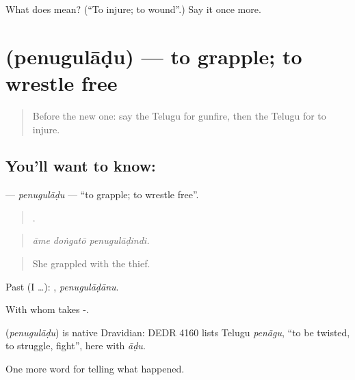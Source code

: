 \begin{tcolorbox}[breakable,colback=teal!4,colframe=teal!35!black,title={Before you move on}]
What does  mean? (\textquotedblleft{}To injure; to wound\textquotedblright{}.) Say it once more.
\end{tcolorbox}
\section[\texorpdfstring{\te{పెనుగులాడు} (penugulāḍu)}{పెనుగులాడు (penugulāḍu)}]{ (penugulāḍu) — to grapple; to wrestle free}

\label{lesson:TE-C378-penuguladu}



\begin{quote}
Before the new one: say the Telugu for gunfire, then the Telugu for to injure.
\end{quote}

\subsection*{You'll want to know: }
\textbf{} — \emph{penugulāḍu} — \textquotedblleft{}to grapple; to wrestle free\textquotedblright{}.

\begin{quote}
  .
\end{quote}

\begin{quote}
\emph{āme doṅgatō penugulāḍindi.}
\end{quote}

\begin{quote}
She grappled with the thief.
\end{quote}

Past (I …): , \emph{penugulāḍānu}.

With whom takes -.

\begin{cousinweb}
\textbf{} (\emph{penugulāḍu}) is native Dravidian: DEDR 4160 lists Telugu \emph{penãgu}, \textquotedblleft{}to be twisted, to struggle, fight\textquotedblright{}, here with \emph{āḍu}.
\end{cousinweb}

\begin{grammarlens}[title={What you've built}]
One more word for telling what happened.
\end{grammarlens}

